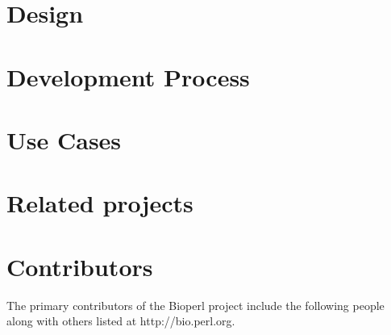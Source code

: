 \documentclass{article}
\begin{document}
\begin{twocolumn}
\section{Design}

\section{Development Process}

\section{Use Cases}

\section{Related projects}

\section{Contributors}

The primary contributors of the Bioperl project include the following
people along with others listed at http://bio.perl.org.



\end{twocolumn}
\end{document}
